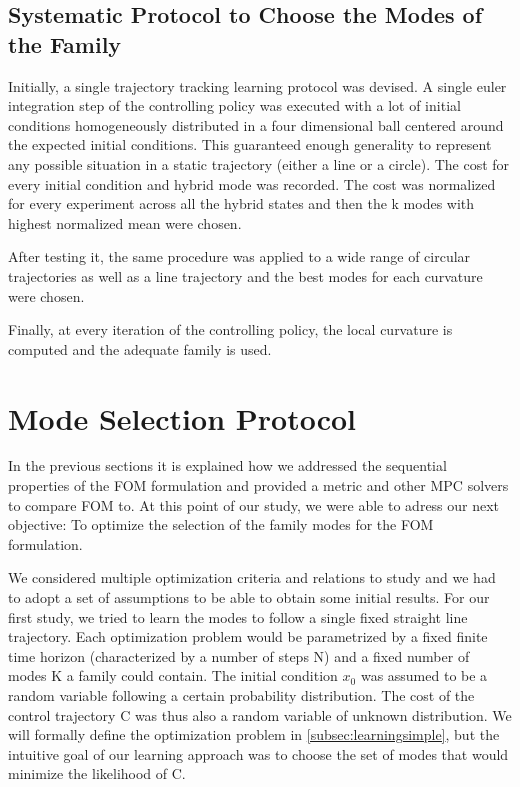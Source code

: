 \documentclass[12,twoside]{TFG-GM}
\theoremstyle{definition}
\theoremstyle{remark}
\begin{document}
\subsection{Systematic Protocol to Choose the Modes of the Family}
Initially, a single trajectory tracking learning protocol was devised. A single euler integration step of the controlling policy was executed with a lot of initial conditions homogeneously distributed in a four dimensional ball centered around the expected initial conditions. This guaranteed enough generality to represent any possible situation in a static trajectory (either a line or a circle). The cost for every initial condition and hybrid mode was recorded. The cost was normalized for every experiment across all the hybrid states and then the k modes with highest normalized mean were chosen.

After testing it, the same procedure was applied to a wide range of circular trajectories as well as a line trajectory and the best modes for each curvature were chosen.

Finally, at every iteration of the controlling policy, the local curvature is computed and the adequate family is used.

\section{Mode Selection Protocol}
\label{sec:modeselection}
In the previous sections it is explained how we addressed the sequential properties of the FOM formulation and provided a metric and other MPC solvers to compare FOM to. At this point of our study, we were able to adress our next objective: To optimize the selection of the family modes for the FOM formulation.

We considered multiple optimization criteria and relations to study and we had to adopt a set of assumptions to be able to obtain some initial results. For our first study, we tried to learn the modes to follow a single fixed straight line trajectory. Each optimization problem would be parametrized by a fixed finite time horizon (characterized by a number of steps N) and a fixed number of modes K a family could contain. The initial condition $x_0$ was assumed to be a random variable following a certain probability distribution. The cost of the control trajectory C was thus also a random variable of unknown distribution. We will formally define the optimization problem in \ref{subsec:learningsimple}, but the intuitive goal of our learning approach was to choose the set of modes that would minimize the likelihood of C.
\end{document}
